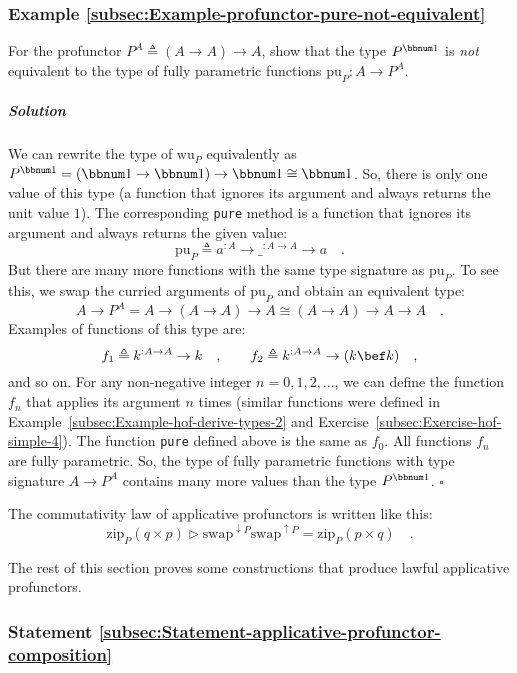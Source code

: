 \subsubsection{Example \label{subsec:Example-profunctor-pure-not-equivalent}\ref{subsec:Example-profunctor-pure-not-equivalent}}

For the profunctor $P^{A}\triangleq\left(A\rightarrow A\right)\rightarrow A$,
show that the type $P^{\bbnum 1}$ is \emph{not} equivalent to the
type of fully parametric functions $\text{pu}_{P}:A\rightarrow P^{A}$.

\subparagraph{Solution}

We can rewrite the type of $\text{wu}_{P}$ equivalently as $P^{\bbnum 1}=\left(\bbnum 1\rightarrow\bbnum 1\right)\rightarrow\bbnum 1\cong\bbnum 1$.
So, there is only one value of this type (a function that ignores
its argument and always returns the unit value $1$). The corresponding
\lstinline!pure! method is a function that ignores its argument and
always returns the given value:
\[
\text{pu}_{P}\triangleq a^{:A}\rightarrow\_^{:A\rightarrow A}\rightarrow a\quad.
\]
But there are many more functions with the same type signature as
$\text{pu}_{P}$. To see this, we swap the curried arguments of $\text{pu}_{P}$
and obtain an equivalent type: 
\[
A\rightarrow P^{A}=A\rightarrow\left(A\rightarrow A\right)\rightarrow A\cong\left(A\rightarrow A\right)\rightarrow A\rightarrow A\quad.
\]
Examples of functions of this type are:
\[
f_{1}\triangleq k^{:A\rightarrow A}\rightarrow k\quad,\quad\quad f_{2}\triangleq k^{:A\rightarrow A}\rightarrow(k\bef k)\quad,
\]
and so on. For any non-negative integer $n=0,1,2,...$, we can define
the function $f_{n}$ that applies its argument $n$ times (similar
functions were defined in Example~\ref{subsec:Example-hof-derive-types-2}
and Exercise~\ref{subsec:Exercise-hof-simple-4}). The function \lstinline!pure!
defined above is the same as $f_{0}$. All functions $f_{n}$ are
fully parametric. So, the type of fully parametric functions with
type signature $A\rightarrow P^{A}$ contains many more values than
the type $P^{\bbnum 1}$. $\square$

The commutativity law of applicative profunctors is written like this:
\[
\text{zip}_{P}(q\times p)\triangleright\text{swap}^{\downarrow P}\text{swap}^{\uparrow P}=\text{zip}_{P}(p\times q)\quad.
\]

The rest of this section proves some constructions that produce lawful
applicative profunctors.

\subsubsection{Statement \label{subsec:Statement-applicative-profunctor-composition}\ref{subsec:Statement-applicative-profunctor-composition}}

